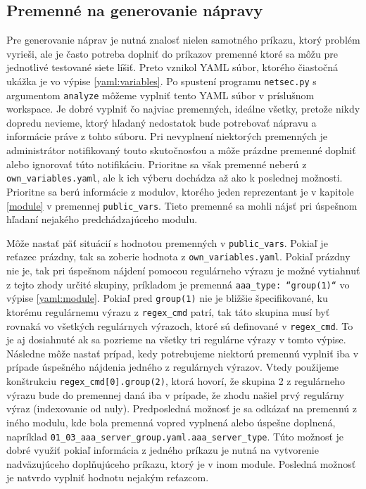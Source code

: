 \subsection{Premenné na generovanie nápravy}
\label{variables_generate}
Pre generovanie náprav je nutná znalosť nielen samotného príkazu, ktorý problém vyrieši, ale je často potreba doplniť do príkazov premenné ktoré sa môžu pre jednotlivé testované siete líšiť. Preto vznikol YAML súbor, ktorého čiastočná ukážka je vo výpise \ref{yaml:variables}. Po spustení programu \texttt{netsec.py} s argumentom \texttt{analyze} môžeme vyplniť tento YAML súbor v príslušnom workspace. Je dobré vyplniť čo najviac premenných, ideálne všetky, pretože nikdy dopredu nevieme, ktorý hľadaný nedostatok bude potrebovať nápravu a informácie práve z tohto súboru. Pri nevyplnení niektorých premenných je administrátor notifikovaný touto skutočnosťou a môže prázdne premenné doplniť alebo ignorovať túto notifikáciu. Prioritne sa však premenné neberú z \texttt{own\_variables.yaml}, ale k ich výberu dochádza až ako k poslednej možnosti. Prioritne sa berú informácie z modulov, ktorého jeden reprezentant je v kapitole \ref{module} v premennej \texttt{public\_vars}. Tieto premenné sa mohli nájsť pri úspešnom hľadaní nejakého predchádzajúceho modulu. 

Môže nastať päť situácií s hodnotou premenných v \texttt{public\_vars}. Pokiaľ je reťazec prázdny, tak sa zoberie hodnota z \texttt{own\_variables.yaml}. Pokiaľ prázdny nie je, tak pri úspešnom nájdení pomocou regulárneho výrazu je možné vytiahnuť z tejto zhody určité skupiny, príkladom je premenná \texttt{aaa\_type: ``group(1)``} vo výpise \ref{yaml:module}. Pokiaľ pred \texttt{group(1)} nie je bližšie špecifikované, ku ktorému regulárnemu výrazu z \texttt{regex\_cmd} patrí, tak táto skupina musí byť rovnaká vo všetkých regulárnych výrazoch, ktoré sú definované v \texttt{regex\_cmd}. To je aj dosiahnuté ak sa pozrieme na všetky tri regulárne výrazy v tomto výpise. Následne môže nastať prípad, kedy potrebujeme niektorú premennú vyplniť iba v prípade úspešného nájdenia jedného z regulárnych výrazov. Vtedy použijeme konštrukciu \texttt{regex\_cmd[0].group(2)}, ktorá hovorí, že skupina 2 z regulárneho výrazu bude do premennej daná iba v prípade, že zhodu našiel prvý regulárny výraz (indexovanie od nuly). Predposledná možnosť je sa odkázať na premennú z iného modulu, kde bola premenná vopred vyplnená alebo úspešne doplnená, napríklad \texttt{01\_03\_aaa\_server\_group.yaml.aaa\_server\_type}. Túto možnosť je dobré využiť pokiaľ informácia z jedného príkazu je nutná na vytvorenie nadväzujúceho doplňujúceho príkazu, ktorý je v inom module. Posledná možnosť je natvrdo vyplniť hodnotu nejakým reťazcom.

